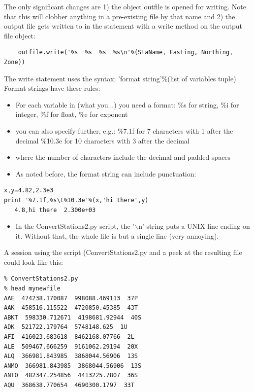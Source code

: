\documentclass[11pt]{book}
\begin{document}
{{\noindent
The only significant changes are 1) the object {\color{blue}outfile} is opened for writing. Note that this will clobber anything in a pre-existing file by that name and 2) the output file gets written to in the statement with a write method on the output file object:
{ \color{blue} \begin{verbatim}
    outfile.write('%s  %s  %s  %s\n'%(StaName, Easting, Northing, Zone))
\end{verbatim}}
\noindent
The write statement uses the syntax:  'format string'\%(list of variables tuple).  Format strings have these rules:

\begin{itemize}
\item For each variable in (what you...) you need a format:  \%s for string, \%i for integer, \%f for float, \%e for exponent
\item you can also specify further, e.g.:
\%7.1f  for 7 characters with 1 after the decimal
\%10.3e for 10 characters with 3 after the decimal
\item where the number of characters include the decimal and padded spaces
\item As noted before, the format string can include punctuation:
\end{itemize}
{ \color{blue} \begin{verbatim}
x,y=4.82,2.3e3
print '%7.1f,%s\t%10.3e'%(x,'hi there',y)
   4.8,hi there	 2.300e+03
\end{verbatim}}
\begin{itemize}
\item In the {\color{blue}ConvertStations2.py} script, the  '$\backslash$n' string puts a UNIX line ending on it.  Without that, the whole file is but a single line (very annoying).
\end{itemize}




\noindent A session using the script ({\color{blue}ConvertStations2.py} and a peek at the resulting file could look like this:
{ \color{blue} \begin{verbatim}
% ConvertStations2.py
% head mynewfile
AAE  474238.170087  998088.469113  37P
AAK  458516.115522  4720850.45385  43T
ABKT  598330.712671  4198681.92944  40S
ADK  521722.179764  5748148.625  1U
AFI  416023.683618  8462168.07766  2L
ALE  509467.666259  9161062.29194  20X
ALQ  366981.843985  3868044.56906  13S
ANMO  366981.843985  3868044.56906  13S
ANTO  482347.254856  4413225.7807  36S
AQU  368638.770654  4690300.1797  33T
\end{verbatim}}

}}
\end{document}
